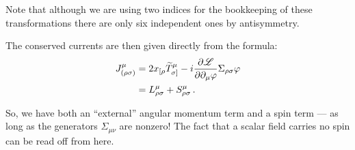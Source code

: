 \documentclass[main.tex]{subfiles}
\begin{document}
Note that although we are using two indices for the bookkeeping of these transformations there are only six independent ones by antisymmetry. 

The conserved currents are then given directly from the formula: 
%
\begin{subequations}
\begin{align}
J^{\mu }_{(\rho \sigma )} &= 2 x_{[\rho } \widetilde{T}_{\sigma ]}^{\mu } - i \pdv{\mathscr{L}}{\partial_{\mu }\varphi } \Sigma_{\rho \sigma } \varphi  \label{eq:conserved-currents-Lorentz}\\
&= L^{\mu }_{\rho \sigma } + S^{\mu }_{\rho \sigma }
\,.
\end{align}
\end{subequations}


So, we have both an ``external'' angular momentum term and a spin term --- as long as the generators \(\Sigma_{\mu  \nu }\) are nonzero! The fact that a scalar field carries no spin can be read off from here. 
\end{document}
